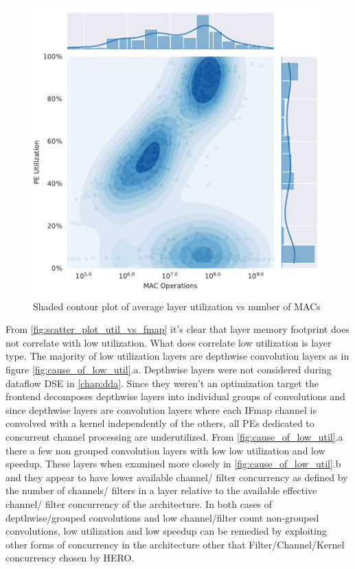 \begin{figure}[ht]
    \centering
    \includegraphics[scale=0.58]{Plots/utilization/util_vs_macs.pdf}
    \caption{Shaded contour plot of average layer utilization vs number of MACs}
    \label{fig:utilization_macs_scaling}
\end{figure}

From \autoref{fig:scatter_plot_util_vs_fmap} it's clear that layer memory
footprint does not correlate with low utilization. What does correlate low
utilization is layer type. The majority of low utilization layers are depthwise
convolution layers as in figure \autoref{fig:cause_of_low_util}.a. Depthwise
layers were not considered during dataflow DSE in \autoref{chap:dda}. Since they
weren't an optimization target the frontend decomposes depthwise layers into
individual groups of convolutions and since depthwise layers are convolution
layers where each IFmap channel is convolved with a kernel independently of the
others, all PEs dedicated to concurrent channel processing are underutilized.
From \autoref{fig:cause_of_low_util}.a there a few non grouped convolution
layers with low low utilization and low speedup. These layers when examined more
closely in \autoref{fig:cause_of_low_util}.b and they appear to have lower
available channel/ filter concurrency as defined by the number of channels/
filters in a layer relative to the available effective channel/ filter
concurrency of the architecture. In both cases of depthwise/grouped convolutions
and low channel/filter count non-grouped convolutions, low utilization and low
speedup can be remedied by exploiting other forms of concurrency in the
architecture other that Filter/Channel/Kernel concurrency chosen by HERO. 

